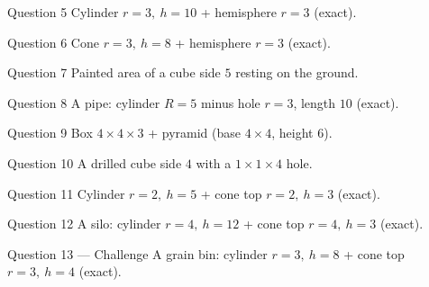 \documentclass[11pt]{article}
\begin{document}
\begin{qbox}{Question 5}
Cylinder $r=3,\ h=10$ + hemisphere $r=3$ (exact).\workspace{2.2cm}
\end{qbox}

\begin{qbox}{Question 6}
Cone $r=3,\ h=8$ + hemisphere $r=3$ (exact).\workspace{2.2cm}
\end{qbox}

\begin{qbox}{Question 7}
Painted area of a cube side $5$ resting on the ground.\workspace{2.0cm}
\end{qbox}

\begin{qbox}{Question 8}
A pipe: cylinder $R=5$ minus hole $r=3$, length $10$ (exact).\workspace{2.4cm}
\end{qbox}

\begin{qbox}{Question 9}
Box $4\times4\times3$ + pyramid (base $4\times4$, height $6$).\workspace{2.2cm}
\end{qbox}

\begin{qbox}{Question 10}
A drilled cube side $4$ with a $1\times1\times4$ hole.\workspace{2.2cm}
\end{qbox}

\begin{qbox}{Question 11}
Cylinder $r=2,\ h=5$ + cone top $r=2,\ h=3$ (exact).\workspace{2.4cm}
\end{qbox}

\begin{qbox}{Question 12}
A silo: cylinder $r=4,\ h=12$ + cone top $r=4,\ h=3$ (exact).\workspace{2.4cm}
\end{qbox}

\begin{qbox}{Question 13 --- Challenge}
A grain bin: cylinder $r=3,\ h=8$ + cone top $r=3,\ h=4$ (exact).\workspace{2.6cm}
\end{qbox}

\clearpage
{}
\end{document}
